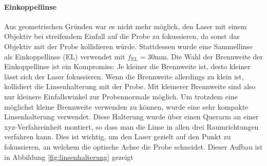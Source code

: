 \documentclass[titlepage]{article}
\begin{document}
	\paragraph{Einkoppellinse}
	Aus geometrischen Gründen war es nicht mehr möglich, den Laser mit einem Objektiv bei streifendem Einfall auf die Probe zu fokussieren, da sonst das Objektiv mit der Probe kollidieren würde. Stattdessen wurde eine Sammellinse als Einkoppellinse (EL) verwendet mit $f_{\mathrm{EL}}= 30\mathrm{mm}$. Die Wahl der Brennweite der Einkoppellinse ist ein Kompromiss: Je kleiner die Brennweite ist, desto kleiner lässt sich der Laser fokussieren. Wenn die Brennweite allerdings zu klein ist, kollidiert die Linsenhalterung mit der Probe. Mit kleinerer Brennweite sind also nur kleinere Einfallswinkel zur Probennormale möglich. Um trotzdem eine möglichst kleine Brennweite verwenden zu können, wurde eine sehr kompakte Linsenhalterung verwendet. Diese Halterung wurde über einen Querarm an einer xyz-Verfahreinheit montiert, so dass man die Linse in allen drei Raumrichtungen verfahren kann. Dies ist wichtig, um den Laser gezielt auf den Punkt zu fokussieren, an welchem die optische Achse die Probe schneidet. Dieser Aufbau ist in Abbildung \ref{fig:linsenhalterung} gezeigt
\end{document}
